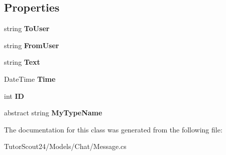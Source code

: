 \subsection*{Properties}
\begin{DoxyCompactItemize}
\item 
\mbox{\label{class_tutor_scout24_1_1_models_1_1_chat_1_1_message_aaab4e5e2d9f674b569c5aa8af4c8d5ca}} 
string {\bfseries To\+User}
\item 
\mbox{\label{class_tutor_scout24_1_1_models_1_1_chat_1_1_message_a4bd37d2e9729e41601b344d98243e5b9}} 
string {\bfseries From\+User}
\item 
\mbox{\label{class_tutor_scout24_1_1_models_1_1_chat_1_1_message_a0c31b7539529bbac9750a91f222021d0}} 
string {\bfseries Text}
\item 
\mbox{\label{class_tutor_scout24_1_1_models_1_1_chat_1_1_message_ac3cde8214549b23e94a71864bd488d5d}} 
Date\+Time {\bfseries Time}
\item 
\mbox{\label{class_tutor_scout24_1_1_models_1_1_chat_1_1_message_a69584c08616248f509009eff1891e326}} 
int {\bfseries ID}
\item 
\mbox{\label{class_tutor_scout24_1_1_models_1_1_chat_1_1_message_a6f63fa6a8093a50c0b3e6e3d0903e422}} 
abstract string {\bfseries My\+Type\+Name}
\end{DoxyCompactItemize}


The documentation for this class was generated from the following file\+:\begin{DoxyCompactItemize}
\item 
Tutor\+Scout24/\+Models/\+Chat/Message.\+cs\end{DoxyCompactItemize}
